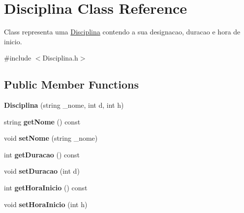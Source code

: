 \hypertarget{class_disciplina}{\section{Disciplina Class Reference}
\label{class_disciplina}
}


Class representa uma \hyperlink{class_disciplina}{Disciplina} contendo a sua designacao, duracao e hora de inicio.  




{\ttfamily \#include $<$Disciplina.\-h$>$}

\subsection*{Public Member Functions}
\begin{DoxyCompactItemize}
\item 
\hypertarget{class_disciplina_ae4496d51677842852775c89892387daf}{{\bfseries Disciplina} (string \-\_\-nome, int d, int h)}\label{class_disciplina_ae4496d51677842852775c89892387daf}

\item 
\hypertarget{class_disciplina_a09445908668708d2b62feb8b600a6af6}{string {\bfseries get\-Nome} () const }\label{class_disciplina_a09445908668708d2b62feb8b600a6af6}

\item 
\hypertarget{class_disciplina_a2d8e0957375f6d9f1f720a58acfb80de}{void {\bfseries set\-Nome} (string \-\_\-nome)}\label{class_disciplina_a2d8e0957375f6d9f1f720a58acfb80de}

\item 
\hypertarget{class_disciplina_aa3f19dc881279231e7eaa3194f01c4df}{int {\bfseries get\-Duracao} () const }\label{class_disciplina_aa3f19dc881279231e7eaa3194f01c4df}

\item 
\hypertarget{class_disciplina_aadc65f8c2f09352cc6f80881d67e720d}{void {\bfseries set\-Duracao} (int d)}\label{class_disciplina_aadc65f8c2f09352cc6f80881d67e720d}

\item 
\hypertarget{class_disciplina_afde765c64f78f530d09d404d15c4c5dd}{int {\bfseries get\-Hora\-Inicio} () const }\label{class_disciplina_afde765c64f78f530d09d404d15c4c5dd}

\item 
\hypertarget{class_disciplina_aa6822138c1277be2b2c5c420c1a1f34d}{void {\bfseries set\-Hora\-Inicio} (int h)}\label{class_disciplina_aa6822138c1277be2b2c5c420c1a1f34d}


\end{DoxyCompactItemize}
